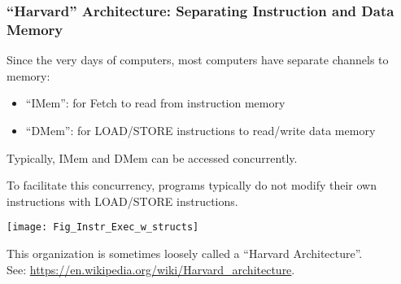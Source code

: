 \begin{frame}[fragile]
\frametitle{``Harvard'' Architecture: Separating Instruction and Data Memory}

\footnotesize

\begin{minipage}{0.35\textwidth}

 Since the very days of computers, most computers have separate channels to memory:

 \begin{itemize}

  \item ``IMem'': for Fetch to read from instruction memory

  \item ``DMem'': for LOAD/STORE instructions to read/write data memory

 \end{itemize}

 Typically, IMem and DMem can be accessed concurrently.

To facilitate this concurrency, programs typically do not modify their
 own instructions with LOAD/STORE instructions.

\end{minipage}
\hm
\begin{minipage}{0.6\textwidth}

 \begin{center}
  \texttt{[image: Fig\_Instr\_Exec\_w\_structs]}
 \end{center}

\end{minipage}

\vfill

This organization is sometimes loosely called a ``Harvard Architecture''. \\
See: \hm \url{https://en.wikipedia.org/wiki/Harvard_architecture}.

\end{frame}






